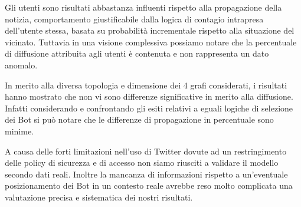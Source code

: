     Gli utenti sono risultati abbastanza influenti rispetto alla propagazione della notizia, comportamento giustificabile dalla logica di contagio intrapresa dell'utente stessa, basata su probabilità incrementale rispetto alla situazione del vicinato. Tuttavia in una visione complessiva possiamo notare che la percentuale di diffusione attribuita agli utenti è contenuta e non rappresenta un dato anomalo.

    \hspace{15pt}
    In merito alla diversa topologia e dimensione dei 4 grafi considerati, i risultati hanno mostrato che non vi sono differenze significative in merito alla diffusione. Infatti considerando e confrontando gli esiti relativi a eguali logiche di selezione dei Bot si può notare che le differenze di propagazione in percentuale sono minime.
    
    \hspace{15pt}
    A causa delle forti limitazioni nell'uso di Twitter dovute ad un restringimento delle policy di sicurezza e di accesso non siamo riusciti a validare il modello secondo dati reali. Inoltre la mancanza di informazioni rispetto a un'eventuale posizionamento dei Bot in un contesto reale avrebbe reso molto complicata una valutazione precisa e sistematica dei nostri risultati.